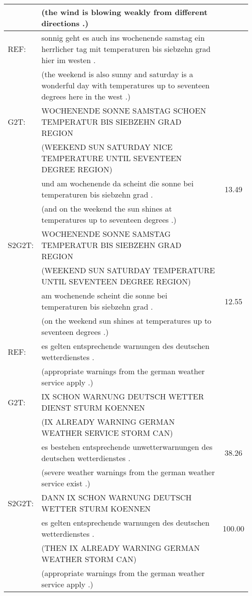 \documentclass[11pt]{article}
\begin{document}
\begin{center}
{\begin{tabular}{ll|c}
  & \footnotesize (the wind is blowing weakly from different directions .)& \\  
 
 \midrule
  
  REF: & sonnig geht es auch ins wochenende samstag ein herrlicher tag mit temperaturen bis siebzehn grad hier im westen . & \\
  &\footnotesize (the weekend is also sunny and saturday is a wonderful day with temperatures up to seventeen degrees here in the west .) \\
 G2T: & WOCHENENDE SONNE SAMSTAG SCHOEN TEMPERATUR BIS SIEBZEHN GRAD REGION &\\
   & \footnotesize (WEEKEND SUN SATURDAY NICE TEMPERATURE UNTIL SEVENTEEN DEGREE REGION)  & \\
   & und am wochenende da scheint die sonne bei temperaturen bis siebzehn grad . & 13.49 \\
   & \footnotesize (and on the weekend the sun shines at temperatures up to seventeen degrees .)& \\ 
 S2G2T: & WOCHENENDE SONNE SAMSTAG TEMPERATUR BIS SIEBZEHN GRAD REGION & \\
    & \footnotesize (WEEKEND SUN SATURDAY TEMPERATURE UNTIL SEVENTEEN DEGREE REGION) & \\
   & am wochenende scheint die sonne bei temperaturen bis siebzehn grad . & 12.55 \\
  &  \footnotesize (on the weekend sun shines at temperatures up to seventeen degrees .)& \\  
  
   \midrule
  
  REF: & es gelten entsprechende warnungen des deutschen wetterdienstes . & \\
    &\footnotesize (appropriate warnings from the german weather service apply .) \\
 G2T: & IX SCHON WARNUNG DEUTSCH WETTER DIENST STURM KOENNEN &\\
    & \footnotesize (IX ALREADY WARNING GERMAN WEATHER SERVICE STORM CAN) & \\
& es bestehen entsprechende unwetterwarnungen des deutschen wetterdienstes .  & 38.26 \\    
   &  \footnotesize (severe weather warnings from the german weather service exist .)& \\ 
 S2G2T: & DANN IX SCHON WARNUNG DEUTSCH WETTER STURM KOENNEN &\\
 & es gelten entsprechende warnungen des deutschen wetterdienstes . & 100.00 \\
     & \footnotesize (THEN IX ALREADY WARNING GERMAN WEATHER STORM CAN) & \\
     & \footnotesize (appropriate warnings from the german weather service apply .)& \\ 
 

\end{tabular}}
\end{center}
\end{document}
